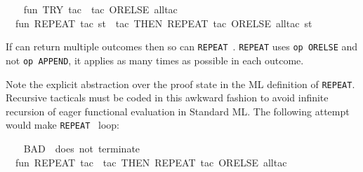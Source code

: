 \begin{isabellebody}
\begin{isamarkuptext}
\begin{itemize}
  \end{itemize}%
\end{isamarkuptext}%
\isamarkuptrue%
%
\endisatagmlex
{\isafoldmlex}%
%
\isadelimmlex
%
\endisadelimmlex
%
\isadelimML
%
\endisadelimML
%
\isatagML
{}\isamarkupfalse%
\ {}\isanewline
\ \ fun\ TRY\ tac\ {}\ tac\ ORELSE\ all{}tac{}\isanewline
\ \ fun\ REPEAT\ tac\ st\ {}\ {}{}tac\ THEN\ REPEAT\ tac{}\ ORELSE\ all{}tac{}\ st{}\isanewline
{}%
\endisatagML
{\isafoldML}%
%
\isadelimML
%
\endisadelimML
%
\begin{isamarkuptext}%
If  can return multiple outcomes then so can \verb|REPEAT|~.  \verb|REPEAT| uses \verb|op ORELSE| and not
  \verb|op APPEND|, it applies  as many times as
  possible in each outcome.

  \begin{warn}
  Note the explicit abstraction over the proof state in the ML
  definition of \verb|REPEAT|.  Recursive tacticals must be coded in
  this awkward fashion to avoid infinite recursion of eager functional
  evaluation in Standard ML.  The following attempt would make \verb|REPEAT|~ loop:
  \end{warn}%
\end{isamarkuptext}%
\isamarkuptrue%
%
\isadelimML
%
\endisadelimML
%
\isatagML
{}\isamarkupfalse%
\ {}\isanewline
\ \ {}{}BAD\ {}{}\ does\ not\ terminate{}{}{}\isanewline
\ \ fun\ REPEAT\ tac\ {}\ {}tac\ THEN\ REPEAT\ tac{}\ ORELSE\ all{}tac{}\isanewline
{}%
\endisatagML
{\isafoldML}%
%
\isadelimML
%
\endisadelimML
\isanewline
%
\isadelimtheory
\isanewline
%
\endisadelimtheory
%
\isatagtheory
{}\isamarkupfalse%
%
\endisatagtheory
{\isafoldtheory}%
%
\isadelimtheory
%
\endisadelimtheory
\isanewline
\end{isabellebody}%
